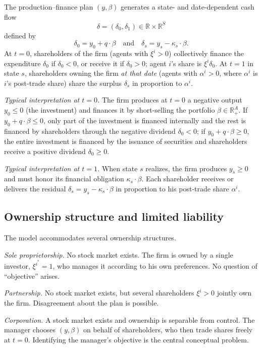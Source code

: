 \documentclass[11pt,a4paper]{article}
\def\R{\mathbb{R}}
\def\leq{\leqslant}
\def\geq{\geqslant}
\def\et{\quad \text{and} \quad}
\theoremstyle{plain}
\theoremstyle{definition}
\theoremstyle{remark}
\begin{document}
The production--finance plan $(y,\beta)$ generates a state- and date-dependent cash flow
\[
  \delta = (\delta_0,\delta_1) \in \R\times\R^S
\]
defined by
\begin{equation}\label{eq:cash-flow}
  \delta_0 = y_0 + q\cdot \beta
  \et
  \delta_s = y_s - \kappa_s\cdot\beta.
\end{equation}
At $t=0$, shareholders of the firm (agents with $\xi^i>0$) collectively finance the expenditure $\delta_0$ if $\delta_0<0$, or receive it if $\delta_0>0$; agent $i$'s share is $\xi^i\delta_0$. At $t=1$ in state $s$, shareholders owning the firm \emph{at that date} (agents with $\alpha^i>0$, where $\alpha^i$ is $i$'s post-trade share) share the surplus $\delta_s$ in proportion to $\alpha^i$.

\emph{Typical interpretation at $t=0$.} The firm produces at $t=0$ a negative output $y_0\leq 0$ (the investment) and finances it by short-selling the portfolio $\beta\in\R^A_+$. If $y_0 + q\cdot\beta \leq 0$, only part of the investment is financed internally and the rest is financed by shareholders through the negative dividend $\delta_0<0$; if $y_0 + q\cdot\beta\geq 0$, the entire investment is financed by the issuance of securities and shareholders receive a positive dividend $\delta_0\geq 0$.

\emph{Typical interpretation at $t=1$.} When state $s$ realizes, the firm produces $y_s\geq 0$ and must honor its financial obligation $\kappa_s\cdot\beta$. Each shareholder receives or delivers the residual $\delta_s = y_s - \kappa_s\cdot\beta$ in proportion to his post-trade share $\alpha^i$.

\subsection{Ownership structure and limited liability}

The model accommodates several ownership structures.

\emph{Sole proprietorship.} No stock market exists. The firm is owned by a single investor, $\xi^{i^\ast}=1$, who manages it according to his own preferences. No question of ``objective'' arises.

\emph{Partnership.} No stock market exists, but several shareholders $\xi^i>0$ jointly own the firm. Disagreement about the plan is possible.

\emph{Corporation.} A stock market exists and ownership is separable from control. The manager chooses $(y,\beta)$ on behalf of shareholders, who then trade shares freely at $t=0$. Identifying the manager's objective is the central conceptual problem.
\end{document}
